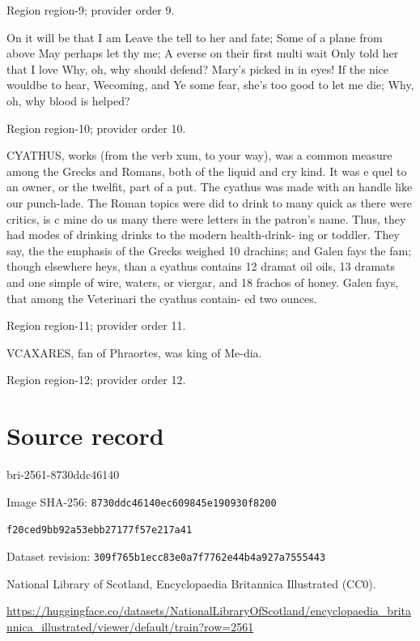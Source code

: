\documentclass[11pt]{article}
\begin{document}
{\scriptsize\color{gray} Region region-9; provider order 9.\par}
\medskip

On it will be that I am Leave the tell to her and fate; Some of a plane from above May perhaps let thy me; A everse on their first multi wait Only told her that I love Why, oh, why should defend? Mary's picked in in eyes! If the nice wouldbe to hear, Wecoming, and Ye some fear, she's too good to let me die; Why, oh, why blood is helped?
\par

{\scriptsize\color{gray} Region region-10; provider order 10.\par}
\medskip

CYATHUS, works (from the verb xum, to your way), was a common measure among the Grecks and Romans, both of the liquid and cry kind. It was e quel to an owner, or the twelfit, part of a put. The cyathus was made with an handle like our punch-lade. The Roman topics were did to drink to many quick as there were critics, is c mine do us many there were letters in the patron's name. Thus, they had modes of drinking drinks to the modern health-drink- ing or toddler. They say, the the emphasis of the Grecks weighed 10 drachins; and Galen fays the fam; though elsewhere heys, than a cyathus contains 12 dramat oil oils, 13 dramats and one simple of wire, waters, or viergar, and 18 frachos of honey. Galen fays, that among the Veterinari the cyathus contain- ed two ounces.
\par

{\scriptsize\color{gray} Region region-11; provider order 11.\par}
\medskip

VCAXARES, fan of Phraortes, was king of Me-dia.
\par

{\scriptsize\color{gray} Region region-12; provider order 12.\par}
\medskip
\newpage\section*{Source record}
bri-2561-8730ddc46140\par
Image SHA-256: \texttt{8730ddc46140ec609845e190930f8200}\par\texttt{f20ced9bb92a53ebb27177f57e217a41}\par
Dataset revision: \texttt{309f765b1ecc83e0a7f7}\texttt{762e44b4a927a7555443}\par
National Library of Scotland, Encyclopaedia Britannica Illustrated (CC0).\par
\url{https://huggingface.co/datasets/NationalLibraryOfScotland/encyclopaedia_britannica_illustrated/viewer/default/train?row=2561}
\end{document}
